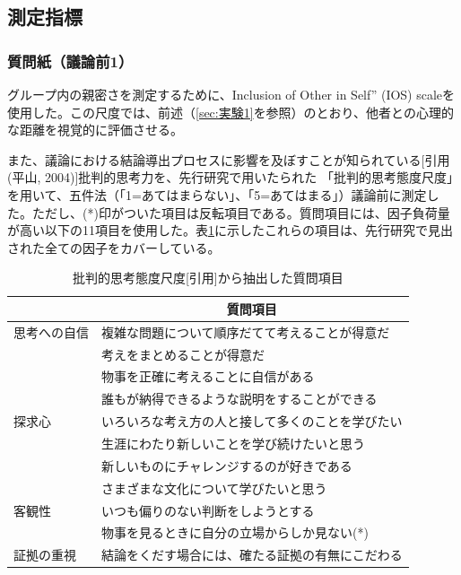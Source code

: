 \documentclass[11pt, a4paper]{jreport} %
\begin{document}
\subsection{測定指標}
\subsubsection*{質問紙（議論前1）}
グループ内の親密さを測定するために、Inclusion of Other in Self” (IOS) scaleを使用した。この尺度では、前述（\ref{sec:実験1}を参照）のとおり、他者との心理的な距離を視覚的に評価させる。



また、議論における結論導出プロセスに影響を及ぼすことが知られている[引用(平山, 2004)]批判的思考力を、先行研究で用いたられた
「批判的思考態度尺度」を用いて、五件法（「1=あてはまらない」、「5=あてはまる」）議論前に測定した。ただし、(*)印がついた項目は反転項目である。質問項目には、因子負荷量が高い以下の11項目を使用した。表\ref{tab:hihanteki3}に示したこれらの項目は、先行研究で見出された全ての因子をカバーしている。
\begin{table}[H]
\caption{批判的思考態度尺度{[}引用{]}から抽出した質問項目}
\centering
\label{tab:hihanteki3}
\begin{tabular}{@{}ll@{}}
\toprule
\multicolumn{1}{c}{} & \multicolumn{1}{c}{質問項目} \\ \midrule
思考への自信               & 複雑な問題について順序だてて考えることが得意だ  \\
                     & 考えをまとめることが得意だ            \\
                     & 物事を正確に考えることに自信がある        \\
                     & 誰もが納得できるような説明をすることができる   \\
探求心                  & いろいろな考え方の人と接して多くのことを学びたい \\
                     & 生涯にわたり新しいことを学び続けたいと思う    \\
                     & 新しいものにチャレンジするのが好きである     \\
                     & さまざまな文化について学びたいと思う       \\
客観性                  & いつも偏りのない判断をしようとする        \\
                     & 物事を見るときに自分の立場からしか見ない(*)     \\
証拠の重視                & 結論をくだす場合には、確たる証拠の有無にこだわる \\ \bottomrule
\end{tabular}
\end{table}
\end{document}
